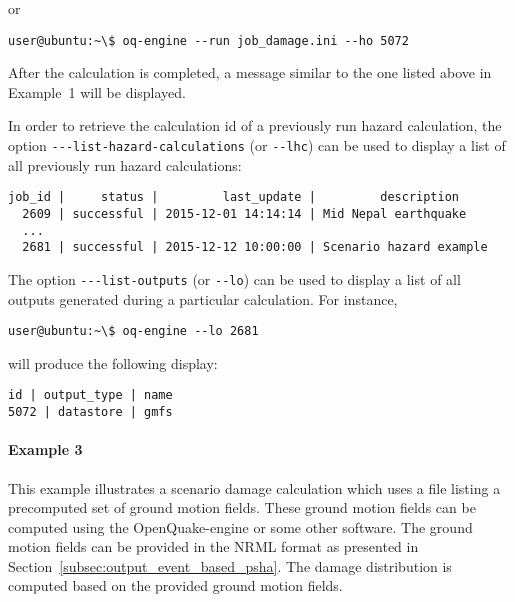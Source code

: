 or

\begin{Verbatim}[frame=single, commandchars=\\\{\}, samepage=true]
user@ubuntu:~\$ oq-engine --run job_damage.ini --ho 5072
\end{Verbatim}

After the calculation is completed, a message similar to the one listed above
in Example~1 will be displayed.

In order to retrieve the calculation id of a previously run hazard calculation,
the option \Verb+---list-hazard-calculations+ (or \Verb+--lhc+) can be used to
display a list of all previously run hazard calculations:

\begin{Verbatim}[frame=single, commandchars=\\\{\}, samepage=true]
job_id |     status |         last_update |         description
  2609 | successful | 2015-12-01 14:14:14 | Mid Nepal earthquake
  ...
  2681 | successful | 2015-12-12 10:00:00 | Scenario hazard example
\end{Verbatim}

The option \Verb+---list-outputs+ (or \Verb+--lo+) can be used to display a
list of all outputs generated during a particular calculation. For instance,

\begin{Verbatim}[frame=single, commandchars=\\\{\}, samepage=true]
user@ubuntu:~\$ oq-engine --lo 2681
\end{Verbatim}

will produce the following display:

\begin{Verbatim}[frame=single, commandchars=\\\{\}, samepage=true]
  id | output_type | name
5072 | datastore | gmfs
\end{Verbatim}


\paragraph{Example 3}

This example illustrates a scenario damage calculation which uses a file
listing a precomputed set of ground motion fields. These ground motion fields
can be computed using the OpenQuake-engine or some other software. The ground
motion fields can be provided in the NRML format as presented in
Section~\ref{subsec:output_event_based_psha}. The damage distribution is
computed based on the provided ground motion fields.

